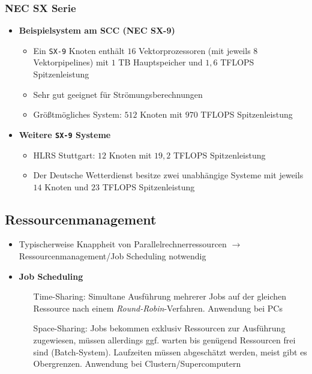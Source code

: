 \subsubsection{NEC SX Serie}
\begin{itemize}
	\item \textbf{Beispielsystem am SCC (NEC SX-9)}
	\begin{itemize}
		\item Ein \texttt{SX-9} Knoten enthält \(16\) Vektorprozessoren (mit jeweils \(8\) Vektorpipelines) mit \(1\) TB Hauptspeicher und \(1,6\) TFLOPS Spitzenleistung
		\item Sehr gut geeignet für Strömungsberechnungen
		\item Größtmögliches System: \(512\) Knoten mit \(970\) TFLOPS Spitzenleistung
	\end{itemize}
	\item \textbf{Weitere \texttt{SX-9} Systeme}
	\begin{itemize}
		\item HLRS Stuttgart: \(12\) Knoten mit \(19,2\) TFLOPS Spitzenleistung
		\item Der Deutsche Wetterdienst besitze zwei unabhängige Systeme mit jeweils \(14\) Knoten und \(23\) TFLOPS Spitzenleistung
	\end{itemize}
\end{itemize}


\subsection{Ressourcenmanagement}
\begin{itemize}
	\item Typischerweise Knappheit von Parallelrechnerressourcen \(\rightarrow\) Ressourcenmanagement/Job Scheduling notwendig
	\item \textbf{Job Scheduling}
	\begin{enumerate}
		\item[Time-Sharing:] Simultane Ausführung mehrerer Jobs auf der gleichen Ressource nach einem \textit{Round-Robin}-Verfahren. Anwendung bei PCs
		\item[Space-Sharing:] Jobs bekommen exklusiv Ressourcen zur Ausführung zugewiesen, müssen allerdings ggf. warten bis genügend Ressourcen frei sind (Batch-System). Laufzeiten müssen abgeschätzt werden, meist gibt es Obergrenzen. Anwendung bei Clustern/Supercomputern
	\end{enumerate}
\end{itemize}



